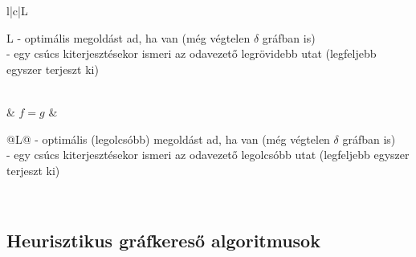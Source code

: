 \documentclass[12pt,margin=0px]{article}
\begin{document}
{{\begin{tabular}{ l|c|L }
                           \begin{tabular}[c]{L}
                                  - optimális megoldást ad, ha van (még végtelen $\delta$ gráfban is)\\
                                  - egy csúcs kiterjesztésekor ismeri az odavezető legrövidebb utat (legfeljebb egyszer terjeszt ki)
                            \end{tabular} \\ \hline
            & $f = g$ &
                           \begin{tabular}[c]{@{}L@{}}
                                  - optimális (legolcsóbb) megoldást ad, ha van (még végtelen $\delta$ gráfban is)\\
                                  - egy csúcs kiterjesztésekor ismeri az odavezető legolcsóbb utat (legfeljebb egyszer terjeszt ki)\\
                            \end{tabular}\\
        \end{tabular}
    \renewcommand{\arraystretch}{1}}

    \subsection*{Heurisztikus gráfkereső algoritmusok}
    
}
\end{document}
